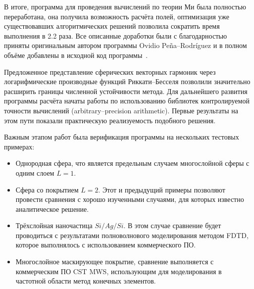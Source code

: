 В итоге, программа для проведения вычислений по теории Ми была полностью
переработана, она получила возможность расчёта полей, оптимизация уже
существовавших алгоритмических решений позволила сократить время
выполнения в 2.2 раза.  Все описанные доработки были с благодарностью
приняты оригинальным автором программы Ovidio Pe\~{n}a--Rodr\'{i}guez и
в полном объёме добавлены в исходной код
программы~\cite{Scattnlay-web}.

Предложенное представление сферических векторных гармоник через
логарифмические производные функций Риккати--Бесселя позволили
значительно расширить границы численной устойчивости метода.  Для
дальнейшего развития программы расчёта начаты работы по использованию
библиотек контролируемой точности вычислений (arbitrary--precision
arithmetic).  Первые результаты на этом пути показали практическую
реализуемость подобного решения.


Важным этапом работ была верификация программы на нескольких
тестовых примерах:
\begin{itemize}
\item Однородная сфера, что является предельным случаем многослойной
  сферы с одним слоем $L=1$.
\item Сфера со покрытием $L=2$. Этот и предыдущий примеры позволяют
  провести сравнения с хорошо изученными случаями, для которых
  известно аналитическое решение.
\item Трёхслойная наночастица $Si/Ag/Si$. В этом случае сравнение
  будет проводиться с результатами полноволнового моделирования
  методом FDTD, которое выполнялось с использованием коммерческого ПО.
\item Многослойное маскирующее покрытие, сравнение выполняется с
  коммерческим ПО CST MWS, использующим для моделирования в частотной
  области метод конечных элементов.
\end{itemize}

